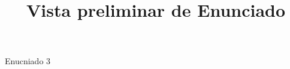\documentclass[a4paper,10pt]{article}\usepackage[utf8]{inputenc}\usepackage[spanish]{babel}\usepackage{arial}
\title{Vista preliminar de Enunciado}
\begin{document}
\twocolumn 

\maketitle

Enucniado 3
\end{document}
